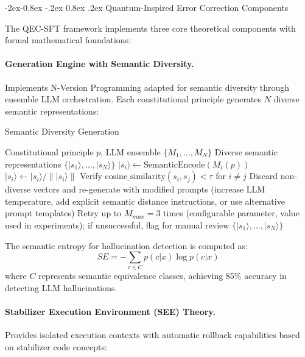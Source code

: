 \documentclass[manuscript,screen,9pt]{acmart}
\makeatletter
\renewcommand\subsubsection{\@startsection{subsubsection}{3}{\z@}%
  {-2ex\@plus -0.8ex \@minus -.2ex}%
  {0.8ex \@plus .2ex}%
  {\normalfont\normalsize\bfseries}}
\makeatother
\begin{document}
\begin{table}[!htb]
\subsubsection{Quantum-Inspired Error Correction Components}

The QEC-SFT framework implements three core theoretical components with formal mathematical foundations:

\paragraph{Generation Engine with Semantic Diversity.} Implements N-Version Programming adapted for semantic diversity through ensemble LLM orchestration. Each constitutional principle generates $N$ diverse semantic representations:

\begin{algorithm}[H]
\caption{Semantic Diversity Generation}
\label{alg:semantic_diversity}
\begin{algorithmic}[1]
\Require Constitutional principle $p$, LLM ensemble $\{M_1, \ldots, M_N\}$
\Ensure Diverse semantic representations $\{|s_1\rangle, \ldots, |s_N\rangle\}$
    \State $|s_i\rangle \leftarrow \text{SemanticEncode}(M_i(p))$
    \State $|s_i\rangle \leftarrow |s_i\rangle / \||s_i\rangle\|$ 
\EndFor
\State Verify $\text{cosine\_similarity}(s_i, s_j) < \tau$ for $i \neq j$ 
    \State Discard non-diverse vectors and re-generate with modified prompts (increase LLM temperature, add explicit semantic distance instructions, or use alternative prompt templates)
    \State Retry up to $M_{max} = 3$ times (configurable parameter, value used in experiments); if unsuccessful, flag for manual review
\EndIf
\State \Return $\{|s_1\rangle, \ldots, |s_N\rangle\}$
\end{algorithmic}
\end{algorithm}

The semantic entropy for hallucination detection is computed as:
$$SE = -\sum_{c \in C} p(c|x) \log p(c|x)$$
where $C$ represents semantic equivalence classes, achieving 85\% accuracy in detecting LLM hallucinations.

\paragraph{Stabilizer Execution Environment (SEE) Theory.} Provides isolated execution contexts with automatic rollback capabilities based on stabilizer code concepts:


\end{table}
\end{document}
